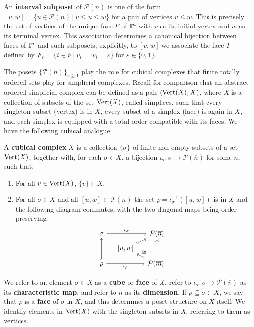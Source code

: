 An \textbf{interval subposet} of $\mathcal P(\overline n)$ is one of the form $[v, w] = \{u \in \mathcal P(\overline n)\ |\ v \leq u \leq w\}$ for a pair of vertices $v \leq w$.
This is precisely the set of vertices of the unique face $F$ of $\mathbb{I}^n$ with $v$ as its initial vertex and $w$ as its terminal vertex.
This association determines a canonical bijection between faces of $\mathbb{I}^n$ and such subposets; explicitly, to $[v, w]$ we associate the face $F$ defined by $F_\varepsilon = \{i \in \overline{n}\ |\ v_i = w_i = \varepsilon\}$ for $\varepsilon \in \{0, 1\}$.

The posets $\{\mathcal P(\overline n)\}_{n \geq 1}$ play the role for cubical complexes that finite totally ordered sets play for simplicial complexes.
Recall for comparison that an abstract ordered simplicial complex can be defined as a pair $({\rm Vert}(X), X)$, where $X$ is a collection of subsets of the set ${\rm Vert}(X)$, called simplices, such that every singleton subset (vertex) is in $X$, every subset of a simplex (face) is again in $X$, and each simplex is equipped with a total order compatible with its faces.
We have the following cubical analogue.

\begin{definition}\label{D:cubical}
	A \textbf{cubical complex} $X$ is a collection $\{ \sigma \}$ of finite non-empty subsets of a set ${\rm Vert}(X)$, together with, for each $\sigma \in X$, a bijection $\iota_\sigma \colon \sigma \to \mathcal P(\overline n)$ for some $n$, such that:
	\begin{enumerate}
		\item For all $v \in {\rm Vert}(X)$, $\{v\} \in X$,
		\item For all $\sigma \in X$ and all $[u,w] \subset \mathcal P(\overline n)$ the set $\rho = \iota_\sigma^{-1}([u,w])$ is in $X$ and the following diagram commutes, with the two diagonal maps being order preserving:
		\begin{equation*}
			\begin{tikzcd} [row sep = tiny, column sep = small]
				\sigma \arrow[rr, "\iota_\sigma"] && \mathcal P(\overline n) \\
				& [-5pt] {[}u,w{]} \arrow[ur, hook] & \\
				\rho \arrow[uu, hook] \arrow[rr, "\iota_\rho"'] && \mathcal P(\overline m).
				\arrow[ul, "\cong"'] \arrow[uu, dashed]
			\end{tikzcd}
		\end{equation*}
	\end{enumerate}
	We refer to an element $\sigma \in X$ as a \textbf{cube} or \textbf{face} of $X$, refer to $\iota_\sigma \colon \sigma \to \mathcal P(\overline{n})$ as its \textbf{characteristic map},
	and refer to $n$ as its \textbf{dimension}.
	If $\rho \subseteq \sigma \in X$, we say that $\rho$ is a \textbf{face} of $\sigma$ in $X$, and this determines a poset structure on $X$ itself.
	We identify elements in ${\rm Vert}(X)$ with the singleton subsets in $X$, referring to them as vertices.
\end{definition}


